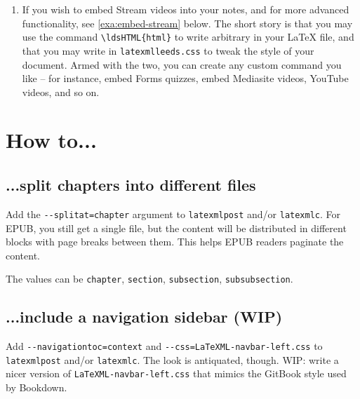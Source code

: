 \documentclass[a4paper]{article}
\def\ltxinline{\lstinline[style=latexml]}
\theoremstyle{definition}
\begin{document}
\begin{enumerate}
\begin{lstlisting}[language=bash]
# to create the EPUB
latexmlc --splitat=chapter --svg \
  --destination=myfile.epub myfile.tex
  \end{lstlisting}
  I strongly recommend you put the output in a subfolder (the \verb|mynotes| in \verb|mynotes/myfile.html| above) since there will be additional files that need to travel together with the main \verb|myfile.html|.

  The option \verb|--splitat=| can split the output in various ways (part, chapter, section\dots{}) according to your needs. You \textbf{must} split long lecture notes, otherwise MathJax will take ages to render your formulas and EPUB readers will spend a long time paginating the content.
  \item If you wish to embed Stream videos into your notes, and for more advanced functionality, see \autoref{exa:embed-stream} below. The short story is that you may use the command \ltxinline|\ldsHTML{html}| to write arbitrary \HTML{} in your \LaTeX{} file, and that you may write in \verb|latexmlleeds.css| to tweak the style of your document. Armed with the two, you can create any custom command you like -- for instance, embed Forms quizzes, embed Mediasite videos, YouTube videos, and so on.
\end{enumerate}

\section{How to...}

\subsection{...split chapters into different files}
Add the \verb|--splitat=chapter| argument to \verb|latexmlpost| and/or \verb|latexmlc|. For EPUB, you still get a single file, but the content will be distributed in different blocks with page breaks between them. This helps EPUB readers paginate the content.

The values can be \verb|chapter|, \verb|section|, \verb|subsection|, \verb|subsubsection|.

\subsection{...include a navigation sidebar (WIP)}
Add \verb|--navigationtoc=context| and \verb|--css=LaTeXML-navbar-left.css| to \verb|latexmlpost| and/or \verb|latexmlc|. The look is antiquated, though. WIP: write a nicer version of \verb|LaTeXML-navbar-left.css| that mimics the GitBook style used by Bookdown.
\end{document}
